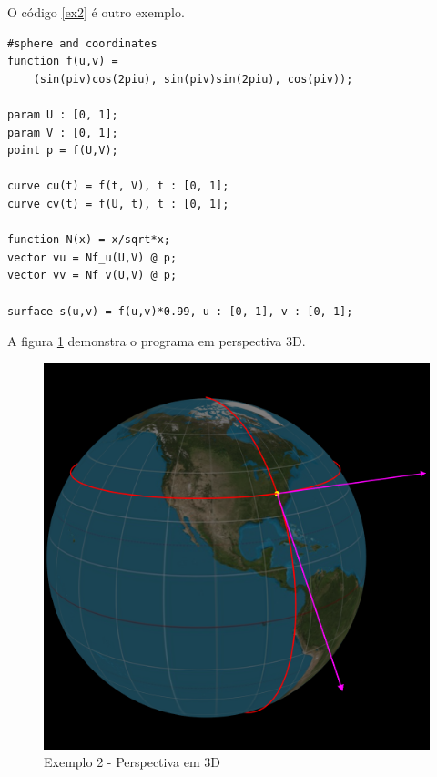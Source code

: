 O código \ref{ex2} é outro exemplo.
\begin{lstlisting}[caption=Exemplo de objetos,label=ex2]
#sphere and coordinates
function f(u,v) = 
    (sin(piv)cos(2piu), sin(piv)sin(2piu), cos(piv));

param U : [0, 1];
param V : [0, 1];
point p = f(U,V);

curve cu(t) = f(t, V), t : [0, 1];
curve cv(t) = f(U, t), t : [0, 1];

function N(x) = x/sqrt*x;
vector vu = Nf_u(U,V) @ p;
vector vv = Nf_v(U,V) @ p;

surface s(u,v) = f(u,v)*0.99, u : [0, 1], v : [0, 1];
\end{lstlisting}

A figura \ref{img:ex2} demonstra o programa em perspectiva 3D.
\begin{figure}[!ht]
    \includegraphics[width=\linewidth]{ex2.png}
    \caption{Exemplo 2 - Perspectiva em 3D}
    \label{img:ex2}
\end{figure}

